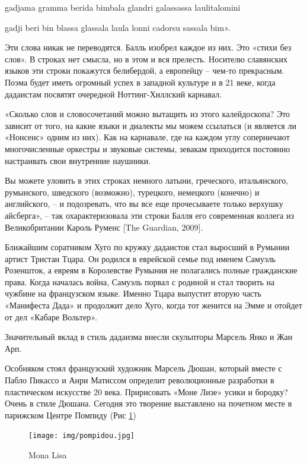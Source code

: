 gadjama gramma berida bimbala glandri galassassa laulitalomini

gadji beri bin blassa glassala laula lonni cadorsu sassala bim».

Эти слова никак не переводятся. Балль изобрел каждое из них. Это «стихи без слов». В строках нет смысла, но в этом и вся прелесть. Носителю славянских языков эти строки покажутся белибердой, а европейцу – чем-то прекрасным. Поэма будет иметь огромный успех в западной культуре и в 21 веке, когда дадаистам посвятят очередной Ноттинг-Хиллский карнавал.

«Сколько слов и словосочетаний можно вытащить из этого калейдоскопа? Это зависит от того, на какие языки и диалекты мы можем ссылаться (и является ли «Нонсенс» одним из них). Как на карнавале, где на каждом углу соперничают многочисленные оркестры и звуковые системы, зевакам приходится постоянно настраивать свои внутренние наушники.

Вы можете уловить в этих строках немного латыни, греческого, итальянского, румынского, шведского (возможно), турецкого, немецкого (конечно) и английского, – и подозревать, что вы все еще прочесываете только верхушку айсберга», – так охарактеризовала эти строки Балля его современная коллега из Великобритании Кароль Руменс [The Guardian, 2009].

Ближайшим соратником Хуго по кружку дадаистов стал выросший в Румынии артист Тристан Тцара. Он родился в еврейской семье под именем Самуэль Розеншток, а евреям в Королевстве Румыния не полагались полные гражданские права. Когда началась война, Самуэль порвал с родиной и стал творить на чужбине на французском языке. Именно Тцара выпустит вторую часть «Манифеста Дада» и продолжит дело Хуго, когда тот женится на Эмме и отойдет от дел «Кабаре Вольтер».

Значительный вклад в стиль дадаизма внесли скульпторы Марсель Янко и Жан Арп.

Особняком стоял французский художник Марсель Дюшан, который вместе с Пабло Пикассо и Анри Матиссом определит революционные разработки в пластическом искусстве 20 века. Пририсовать «Моне Лизе» усики и бородку? Очень в стиле Дюшана. Сегодня это творение выставлено на почетном месте в парижском Центре Помпиду (Рис \ref{fig:mona-lisa})
\begin{figure}
    \centering
    \texttt{[image: img/pompidou.jpg]}
    \caption{Mona Lisa}\label{fig:mona-lisa}
\end{figure}


